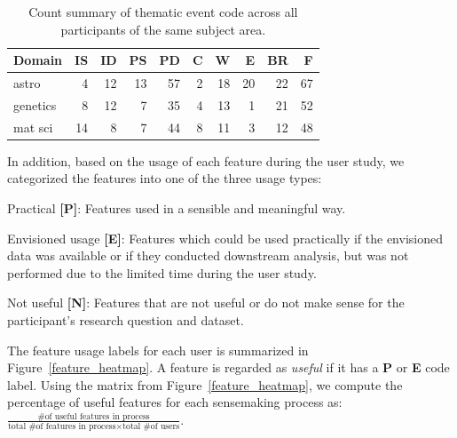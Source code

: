 \begin{table}[h!]
  \begin{tabular}{lrrrrrrrrr}
  \hline
   Domain           &   IS &   ID &   PS &   PD &   C &   W &   E &   BR &   F \\
  \hline
   astro            &    4 &   12 &   13 &   57 &   2 &  18 &  20 &   22 &  67 \\
   genetics         &    8 &   12 &    7 &   35 &   4 &  13 &   1 &   21 &  52 \\
   mat sci          &   14 &    8 &    7 &   44 &   8 &  11 &   3 &   12 &  48 \\
  \hline
  \end{tabular}
  \caption{Count summary of thematic event code across all participants of the same subject area.}
\end{table}
\npar In addition, based on the usage of each feature during the user study, we categorized the features into one of the three usage types:
\begin{denselist}
    \item Practical \textbf{[P]}: Features used in a sensible and meaningful way.
    \item Envisioned usage \textbf{[E]}: Features which could be used practically if the envisioned data was available or if they conducted downstream analysis, but was not performed due to the limited time during the user study.
    \item Not useful \textbf{[N]}: Features that are not useful or do not make sense for the participant's research question and dataset.
\end{denselist}
The feature usage labels for each user is summarized in Figure~\ref{feature_heatmap}. A feature is regarded as \emph{useful} if it has a \textbf{P} or \textbf{E} code label. Using the matrix from Figure~\ref{feature_heatmap}, we compute the percentage of useful features for each sensemaking process as: $\frac{\textrm{\# of useful features in process}}{\textrm{total \# of features in process} \times \textrm{total \# of users}}$.
\vspace{-10pt}
